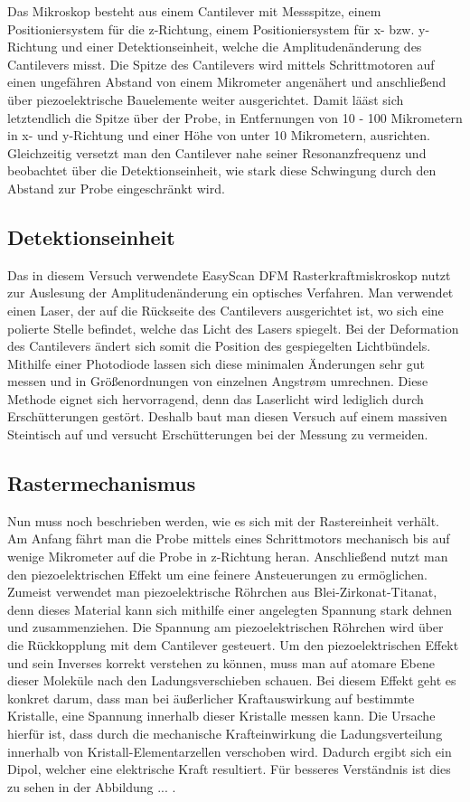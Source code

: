Das Mikroskop besteht aus einem Cantilever mit Messspitze, einem Positioniersystem für die z-Richtung, einem Positioniersystem für x- bzw. y-Richtung und einer Detektionseinheit, welche die Amplitudenänderung des Cantilevers misst.  
Die Spitze des Cantilevers wird mittels Schrittmotoren auf einen ungefähren Abstand von einem Mikrometer angenähert und anschließend über piezoelektrische Bauelemente weiter ausgerichtet.
Damit lääst sich letztendlich die Spitze über der Probe, in Entfernungen von 10 - 100 Mikrometern in x- und y-Richtung und einer Höhe von unter 10 Mikrometern, ausrichten.
Gleichzeitig versetzt man den Cantilever nahe seiner Resonanzfrequenz und beobachtet über die Detektionseinheit, wie stark diese Schwingung durch den Abstand zur Probe eingeschränkt wird.

 \subsection{Detektionseinheit}
 
 Das in diesem Versuch verwendete EasyScan DFM Rasterkraftmiskroskop nutzt zur Auslesung der Amplitudenänderung ein optisches Verfahren. 
 Man verwendet einen Laser, der auf die Rückseite des Cantilevers ausgerichtet ist, wo sich eine polierte Stelle befindet, welche das Licht des Lasers spiegelt.
 Bei der Deformation des Cantilevers ändert sich somit die Position des gespiegelten Lichtbündels.
 Mithilfe einer Photodiode lassen sich diese minimalen Änderungen sehr gut messen und in Größenordnungen von einzelnen Angstrøm umrechnen.
 Diese Methode eignet sich hervorragend, denn das Laserlicht wird lediglich durch Erschütterungen gestört.
 Deshalb baut man diesen Versuch auf einem massiven Steintisch auf und versucht Erschütterungen bei der Messung zu vermeiden.

\subsection{Rastermechanismus}

Nun muss noch beschrieben werden, wie es sich mit der Rastereinheit verhält.
Am Anfang fährt man die Probe mittels eines Schrittmotors mechanisch bis auf wenige Mikrometer auf die Probe in z-Richtung heran.
Anschließend nutzt man den piezoelektrischen Effekt um eine feinere Ansteuerungen zu ermöglichen.
Zumeist verwendet man piezoelektrische Röhrchen aus Blei-Zirkonat-Titanat, denn dieses Material kann sich mithilfe einer angelegten Spannung stark dehnen und zusammenziehen. 
Die Spannung am piezoelektrischen Röhrchen wird über die Rückkopplung mit dem Cantilever gesteuert. 
Um den piezoelektrischen Effekt und sein Inverses korrekt verstehen zu können, muss man auf atomare Ebene dieser Moleküle nach den Ladungsverschieben schauen.
Bei diesem Effekt geht es konkret darum, dass man bei äußerlicher Kraftauswirkung auf bestimmte Kristalle, eine Spannung innerhalb dieser Kristalle messen kann.
Die Ursache hierfür ist, dass durch die mechanische Krafteinwirkung die Ladungsverteilung innerhalb von Kristall-Elementarzellen verschoben wird.
Dadurch ergibt sich ein Dipol, welcher eine elektrische Kraft resultiert.
Für besseres Verständnis ist dies zu sehen in der Abbildung ... .


